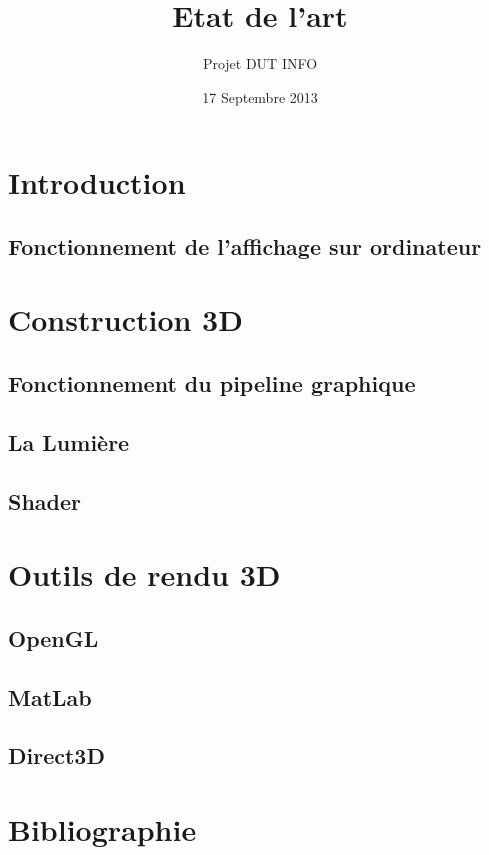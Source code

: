 \documentclass[12pt,a4paper,openany]{report}
\title{Etat de l'art}
\author{Projet DUT INFO}
\date{17 Septembre 2013}
\begin{document}
\maketitle

\hypertarget{tableofcontents}{} %
\tableofcontents

\part{Introduction}

\chapter{Fonctionnement de l'affichage sur ordinateur}


\part{Construction 3D}
\chapter{Fonctionnement du pipeline graphique}


\chapter{La Lumière}


\chapter{Shader}


\part{Outils de rendu 3D}

\chapter{OpenGL}


\chapter{MatLab}

\chapter{Direct3D}




\part{Bibliographie}

\end{document}
